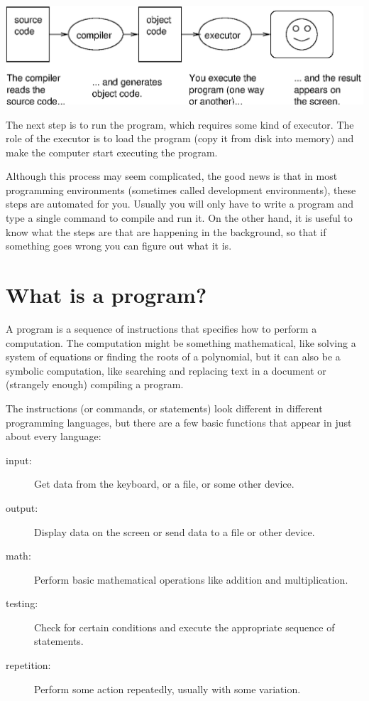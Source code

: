 \vspace{0.1in}
\centering\includegraphics{compile.eps}
\vspace{0.1in}

The next step is to run the program, which requires some kind
of executor.  The role of the executor is to load the program
(copy it from disk into memory) and make the computer start
executing the program.

Although this process may seem complicated, the good news is that in
most programming environments (sometimes called development
environments), these steps are automated for you.  Usually you will
only have to write a program and type a single command to compile and
run it.  On the other hand, it is useful to know what the steps are
that are happening in the background, so that if something goes wrong
you can figure out what it is.

\section{What is a program?}

A program is a sequence of instructions that specifies how to perform
a computation.  The computation might be something mathematical, like
solving a system of equations or finding the roots of a polynomial,
but it can also be a symbolic computation, like searching and
replacing text in a document or (strangely enough) compiling a
program.


The instructions (or commands, or statements) look different in
different programming languages, but there are a few basic functions
that appear in just about every language:

\begin{description}

\item[input:] Get data from the keyboard, or a file, or some
other device.

\item[output:] Display data on the screen or send data to a
file or other device.

\item[math:] Perform basic mathematical operations like addition and
multiplication.

\item[testing:] Check for certain conditions and execute the
appropriate sequence of statements.

\item[repetition:] Perform some action repeatedly, usually with
some variation.

\end{description}

